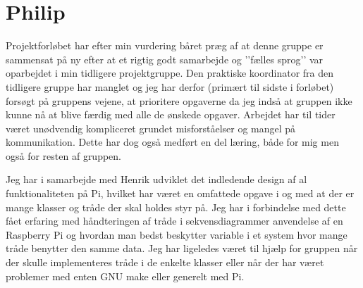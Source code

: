 \section{Philip}

Projektforløbet har efter min vurdering båret præg af at denne gruppe er sammensat på ny efter at et rigtig godt samarbejde og ’’fælles sprog’’ var oparbejdet i min tidligere projektgruppe. Den praktiske koordinator fra den tidligere gruppe har manglet og jeg har derfor (primært til sidste i forløbet) forsøgt på gruppens vejene, at prioritere opgaverne da jeg indså at gruppen ikke kunne nå at blive færdig med alle de ønskede opgaver. Arbejdet har til tider været unødvendig kompliceret grundet misforståelser og mangel på kommunikation. Dette har dog også medført en del læring, både for mig men også for resten af gruppen.

Jeg har i samarbejde med Henrik udviklet det indledende design af al funktionaliteten på Pi, hvilket har været en omfattede opgave i og med at der er mange klasser og tråde der skal holdes styr på. Jeg har i forbindelse med dette fået erfaring med håndteringen af tråde i sekvensdiagrammer anvendelse af en Raspberry Pi og hvordan man bedst beskytter variable i et system hvor mange tråde benytter den samme data. Jeg har ligeledes været til hjælp for gruppen når der skulle implementeres tråde i de enkelte klasser eller når der har været problemer med enten GNU make eller generelt med Pi.
